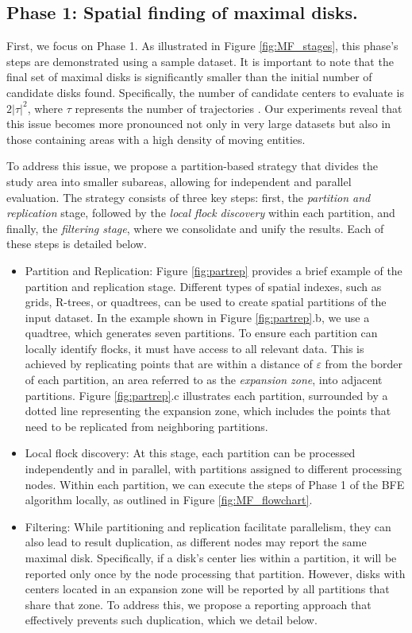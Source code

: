 \subsection{Phase 1: Spatial finding of maximal disks.}
First, we focus on Phase 1. As illustrated in Figure \ref{fig:MF_stages}, this phase's steps are demonstrated using a sample dataset. It is important to note 
that the final set of maximal disks is significantly smaller than the initial number of candidate disks found. Specifically, the number of candidate centers to 
evaluate is $2\lvert\tau\rvert^2$, where $\tau$ represents the number of trajectories \cite{vieira_2009}. Our experiments reveal that this issue becomes more 
pronounced not only in very large datasets but also in those containing areas with a high density of moving entities.

To address this issue, we propose a partition-based strategy that divides the study area into smaller subareas, allowing for independent and parallel evaluation. The strategy consists of three key steps: first, the \textit{partition and replication} stage, followed by the \textit{local flock discovery} within each partition, and finally, the \textit{filtering stage}, where we consolidate and unify the results. Each of these steps is detailed below.

\begin{itemize}
    \item Partition and Replication: Figure \ref{fig:partrep} provides a brief example of the partition and replication stage. Different types of spatial indexes, such as grids, R-trees, or quadtrees, can be used to create spatial partitions of the input dataset. In the example shown in Figure \ref{fig:partrep}.b, we use a quadtree, which generates seven partitions. To ensure each partition can locally identify flocks, it must have access to all relevant data. This is achieved by replicating points that are within a distance of $\varepsilon$ from the border of each partition, an area referred to as the \textit{expansion zone}, into adjacent partitions. Figure \ref{fig:partrep}.c illustrates each partition, surrounded by a dotted line representing the expansion zone, which includes the points that need to be replicated from neighboring partitions.

    \item Local flock discovery: At this stage, each partition can be processed independently and in parallel, with partitions assigned to different processing nodes. Within each partition, we can execute the steps of Phase 1 of the BFE algorithm locally, as outlined in Figure \ref{fig:MF_flowchart}.

    \item Filtering: While partitioning and replication facilitate parallelism, they can also lead to result duplication, as different nodes may report the same maximal disk. Specifically, if a disk's center lies within a partition, it will be reported only once by the node processing that partition. However, disks with centers located in an expansion zone will be reported by all partitions that share that zone. To address this, we propose a reporting approach that effectively prevents such duplication, which we detail below.
\end{itemize}

